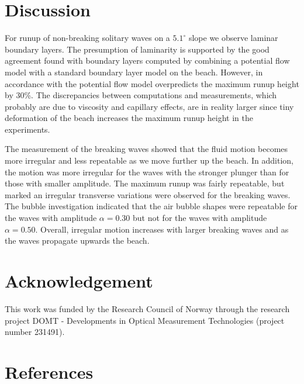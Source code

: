 \documentclass[review, authoryear]{elsarticle}
\begin{document}
 
\section{Discussion}
\label{con_rem}

For runup of non-breaking solitary waves on a $5.1^\circ$ slope we 
observe laminar boundary layers. The presumption of laminarity is
 supported by the good agreement found with boundary layers computed 
by combining a potential flow model with a standard boundary layer model on the beach. However, in accordance with \cite{pedersen2013runup} the
potential flow model overpredicts the
maximum runup height by  30\%.  
The discrepancies between computations and measurements, which probably are due to viscosity and capillary effects, are in reality larger since tiny deformation of the beach increases the maximum runup height in the experiments.

The measurement of the breaking waves showed that the fluid motion becomes more irregular and less repeatable as we move further up the beach. In addition, the motion was more irregular for the waves with the stronger plunger than for those with smaller amplitude. The maximum runup was fairly repeatable, but marked an irregular
transverse  variations were observed for the breaking waves. The bubble investigation indicated
 that the air bubble shapes  were repeatable  for the waves with amplitude $\alpha=0.30$ but not for the waves with amplitude $\alpha=0.50$. Overall, irregular motion increases with larger breaking waves and as the waves propagate upwards the beach.  

\section*{Acknowledgement}

This work was funded by the Research Council of Norway through the research project DOMT - Developments in Optical Measurement Technologies (project number 231491).

\section*{References}

 
\end{document}
